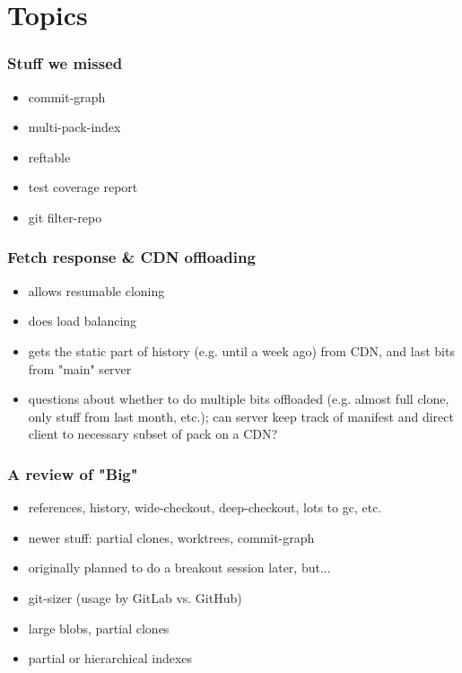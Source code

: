 \documentclass[t]{beamer}
\begin{document}

\section{Topics}

\begin{frame}
  \frametitle{Stuff we missed}

  \begin{itemize}
    \item commit-graph
    \item multi-pack-index
    \item reftable
    \item test coverage report
    \item git filter-repo
  \end{itemize}

\end{frame}


\begin{frame}
  \frametitle{Fetch response \& CDN offloading}

  \begin{itemize}
    \item allows resumable cloning
    \item does load balancing
    \item gets the static part of history (e.g. until a week ago) from CDN, and
      last bits from "main" server
    \item questions about whether to do multiple bits offloaded (e.g. almost
      full clone, only stuff from last month, etc.); can server keep track of
      manifest and direct client to necessary subset of pack on a CDN?
  \end{itemize}

\end{frame}


\begin{frame}
  \frametitle{A review of "Big"}

  \begin{itemize}
    \item references, history, wide-checkout, deep-checkout, lots to gc, etc.
    \item newer stuff: partial clones, worktrees, commit-graph
    \item originally planned to do a breakout session later, but...
    \item git-sizer (usage by GitLab vs. GitHub)
    \item large blobs, partial clones
    \item partial or hierarchical indexes
  \end{itemize}

\end{frame}
\end{document}
